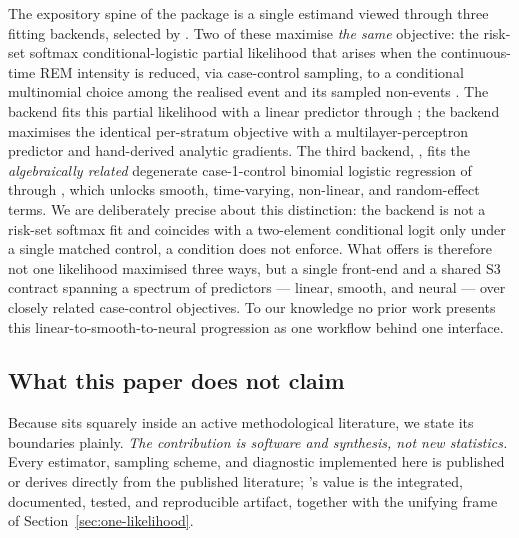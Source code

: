 The expository spine of the package is a single estimand viewed through three
fitting backends, selected by .
Two of these maximise \emph{the same} objective: the risk-set softmax
conditional-logistic partial likelihood that arises when the continuous-time
REM intensity is reduced, via case-control sampling, to a conditional
multinomial choice among the realised event and its sampled non-events
\citep{lerner2020}. The  backend fits this partial likelihood with
a linear predictor through ; the  backend maximises the
identical per-stratum objective with a multilayer-perceptron predictor and
hand-derived analytic gradients. The third backend, , fits the
\emph{algebraically related} degenerate case-1-control binomial logistic
regression of \citet{boschi2025gof, juozaitiene2024} through , which
unlocks smooth, time-varying, non-linear, and random-effect terms. We are
deliberately precise about this distinction: the  backend is not a
risk-set softmax fit and coincides with a two-element conditional logit only
under a single matched control, a condition  does not enforce.
What  offers is therefore not one likelihood maximised three ways,
but a single front-end and a shared  S3 contract spanning a
spectrum of predictors --- linear, smooth, and neural --- over closely related
case-control objectives. To our knowledge no prior work presents this
linear-to-smooth-to-neural progression as one workflow behind one interface.

\subsection{What this paper does not claim}
\label{sec:scope}

Because  sits squarely inside an active methodological literature,
we state its boundaries plainly. \emph{The contribution is software and
synthesis, not new statistics.} Every estimator, sampling scheme, and
diagnostic implemented here is published or derives directly from the
published literature; 's value is the integrated, documented, tested, and
reproducible artifact, together with the unifying frame of
Section~\ref{sec:one-likelihood}.

